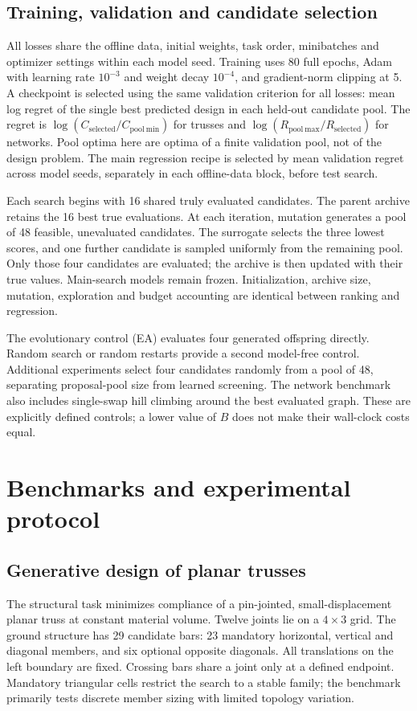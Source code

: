 \documentclass[11pt,a4paper]{article}
\begin{document}
\subsection{Training, validation and candidate selection}
All losses share the offline data, initial weights, task order, minibatches and optimizer settings within each model seed. Training uses 80 full epochs, Adam with learning rate $10^{-3}$ and weight decay $10^{-4}$, and gradient-norm clipping at 5. A checkpoint is selected using the same validation criterion for all losses: mean log regret of the single best predicted design in each held-out candidate pool. The regret is $\log(C_{\mathrm{selected}}/C_{\mathrm{pool\ min}})$ for trusses and $\log(R_{\mathrm{pool\ max}}/R_{\mathrm{selected}})$ for networks. Pool optima here are optima of a finite validation pool, not of the design problem. The main regression recipe is selected by mean validation regret across model seeds, separately in each offline-data block, before test search.

Each search begins with 16 shared truly evaluated candidates. The parent archive retains the 16 best true evaluations. At each iteration, mutation generates a pool of 48 feasible, unevaluated candidates. The surrogate selects the three lowest scores, and one further candidate is sampled uniformly from the remaining pool. Only those four candidates are evaluated; the archive is then updated with their true values. Main-search models remain frozen. Initialization, archive size, mutation, exploration and budget accounting are identical between ranking and regression.

The evolutionary control (EA) evaluates four generated offspring directly. Random search or random restarts provide a second model-free control. Additional experiments select four candidates randomly from a pool of 48, separating proposal-pool size from learned screening. The network benchmark also includes single-swap hill climbing around the best evaluated graph. These are explicitly defined controls; a lower value of $B$ does not make their wall-clock costs equal.

\section{Benchmarks and experimental protocol}
\subsection{Generative design of planar trusses}
The structural task minimizes compliance of a pin-jointed, small-displacement planar truss at constant material volume. Twelve joints lie on a $4\times3$ grid. The ground structure has 29 candidate bars: 23 mandatory horizontal, vertical and diagonal members, and six optional opposite diagonals. All translations on the left boundary are fixed. Crossing bars share a joint only at a defined endpoint. Mandatory triangular cells restrict the search to a stable family; the benchmark primarily tests discrete member sizing with limited topology variation.
\end{document}
